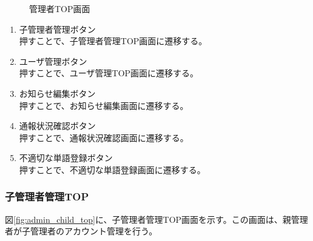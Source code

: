 \documentclass[a4j]{jarticle}
\begin{document}
\begin{figure}[H]
\centering
{}
\caption{管理者TOP画面}
\label{fig:admin_top}
\end{figure}
\begin{enumerate}
  \renewcommand{\labelenumi}{\textcircled{\scriptsize \theenumi}}

\item 子管理者管理ボタン\\
押すことで、子管理者管理TOP画面に遷移する。

\item ユーザ管理ボタン\\
押すことで、ユーザ管理TOP画面に遷移する。

\item お知らせ編集ボタン\\
押すことで、お知らせ編集画面に遷移する。

\item 通報状況確認ボタン\\
押すことで、通報状況確認画面に遷移する。

\item 不適切な単語登録ボタン\\
押すことで、不適切な単語登録画面に遷移する。
\end{enumerate}

\subsubsection{子管理者管理TOP}
図\ref{fig:admin_child_top}に、子管理者管理TOP画面を示す。この画面は、親管理者が子管理者のアカウント管理を行う。
\end{document}
